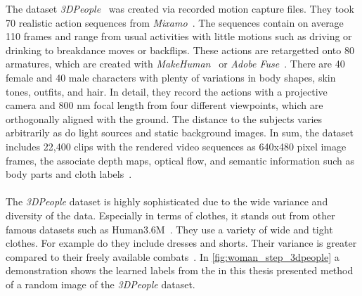 The dataset \textit{3DPeople}~\cite{3dpeople} was created via recorded motion capture files.
They took 70 realistic action sequences from \textit{Mixamo}~\cite{mixamomotionpac}.
The sequences contain on average 110 frames and range from usual activities with little motions such as driving
or drinking to breakdance moves or backflips.
These actions are retargetted onto 80 armatures, which are created with \textit{MakeHuman}~\cite{makehuman} or \textit{Adobe
Fuse}~\cite{adobefuse}.
There are 40 female and 40 male characters with plenty of variations in body shapes, skin tones, outfits, and hair.
In detail, they record the actions with a projective camera and 800 nm focal length from four different viewpoints,
which are orthogonally aligned with the ground.
The distance to the subjects varies arbitrarily as do light sources and static background images.
In sum, the dataset includes 22,400 clips with the rendered video sequences as 640x480 pixel image frames, the associate
depth maps, optical flow, and semantic information such as body parts and cloth labels~\cite{3dpeople}.
\\\mbox{}\\
The \textit{3DPeople} dataset is highly sophisticated due to the wide variance and diversity of the data.
Especially in terms of clothes, it stands out from other famous datasets such as Human3.6M~\cite{humaneva}.
They use a variety of wide and tight clothes. For example do they include dresses and shorts.
Their variance is greater compared to their freely available combats~\cite{human36m, humaneva}.
In \autoref{fig:woman_step_3dpeople} a demonstration shows the learned labels from the in this thesis presented method
of a random image of the
\textit{3DPeople} dataset.





